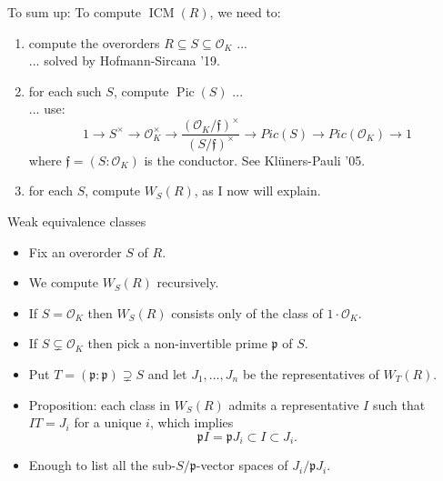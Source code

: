 \documentclass[usenames,dvipsnames,handout]{beamer}
\DeclareMathOperator{\ICM}{ICM}
\DeclareMathOperator{\Pic}{Pic}
\newcommand{\cO}{{\mathcal O}}
\newcommand{\p}{{\mathfrak p}}
\newcommand{\frf}{{\mathfrak f}}
\begin{document}
\begin{frame}{ To sum up: }
    To compute $\ICM(R)$, we need to:
\pause
        \begin{enumerate}
            \vspace{1em}
            \item compute the overorders $R\subseteq S \subseteq \cO_K$ ...\\
                  ... solved by Hofmann-Sircana '19.
            \pause \vspace{1em}
            \item for each such $S$, compute $\Pic(S)$ ...\\
                  ... use:
                  \[ 1 \to S^\times \to \cO_K^\times \to \frac{ \left( \cO_K/\frf \right)^\times  }{ \left( S/\frf \right)^\times } \to Pic(S) \to Pic(\cO_K) \to 1 \]
                  where $\frf=(S:\cO_K)$ is the conductor. See Kl\"uners-Pauli '05.
            \pause \vspace{1em}
            \item for each $S$, compute $W_S(R)$, as I now will explain.
        \end{enumerate}
\end{frame}

\begin{frame}{ Weak equivalence classes }
    \begin{itemize}
    \item Fix an overorder $S$ of $R$.
    \item We compute $W_S(R)$ recursively.
    \item If $S=\cO_K$ then $W_S(R)$ consists only of the class of $1\cdot\cO_K$.
    \item If $S \subsetneq \cO_K$ then pick a non-invertible prime $\p$ of $S$.
    \item Put $T = (\p:\p)\supsetneq S$ and let $J_1,\ldots, J_n$ be the representatives of $W_T(R)$.
    \item Proposition: each class in $W_S(R)$ admits a representative $I$ such that $IT=J_i$ for a unique $i$, which implies
    \[ \p I = \p J_i \subset I \subset J_i. \]
    \item Enough to list all the sub-$S/\p$-vector spaces of $J_i/\p J_i$. 
\pause
    \end{itemize}
\end{frame}
\end{document}
